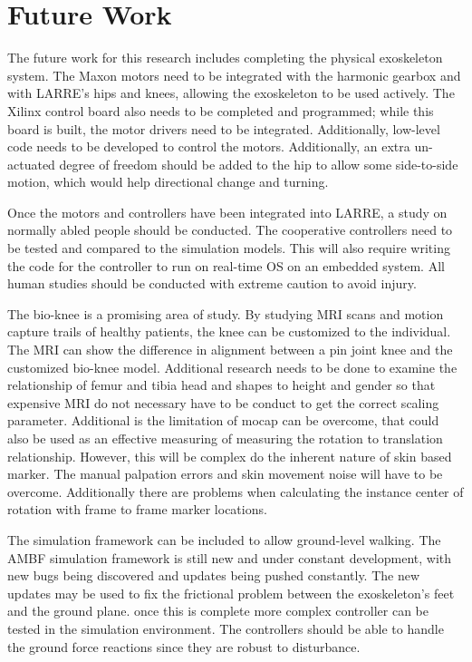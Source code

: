 \section{Future Work}

The future work for this research includes completing the physical exoskeleton system. The Maxon motors need to be integrated with the harmonic gearbox and with LARRE's hips and knees, allowing the exoskeleton to be used actively. The Xilinx control board also needs to be completed and programmed; while this board is built, the motor drivers need to be integrated. Additionally, low-level code needs to be developed to control the motors. Additionally, an extra un-actuated degree of freedom should be added to the hip to allow some side-to-side motion, which would help directional change and turning. 

Once the motors and controllers have been integrated into LARRE, a study on normally abled people should be conducted. The cooperative controllers need to be tested and compared to the simulation models. This will also require writing the code for the controller to run on real-time OS on an embedded system. All human studies should be conducted with extreme caution to avoid injury. 

The bio-knee is a promising area of study. By studying MRI scans and motion capture trails of healthy patients, the knee can be customized to the individual. The MRI can show the difference in alignment between a pin joint knee and the customized bio-knee model. Additional research needs to be done to examine the relationship of femur and tibia head and shapes to height and gender so that expensive MRI do not necessary have to be conduct to get the correct scaling parameter. Additional is the limitation of mocap can be overcome, that could also be used as an effective measuring of measuring the rotation to translation relationship. However, this will be complex do the inherent nature of skin based marker. The manual palpation errors and skin movement noise will have to be overcome. Additionally there are problems when calculating the instance center of rotation with frame to frame marker locations.  

The simulation framework can be included to allow ground-level walking. The AMBF simulation framework is still new and under constant development, with new bugs being discovered and updates being pushed constantly. The new updates may be used to fix the frictional problem between the exoskeleton's feet and the ground plane. once this is complete more complex controller can be tested in the simulation environment. The controllers should be able to handle the ground force reactions since they are robust to disturbance. 



